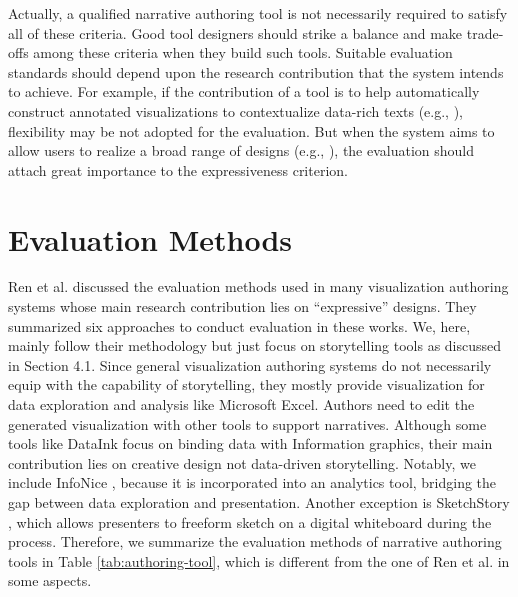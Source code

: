 Actually, a qualified narrative authoring tool is not necessarily required to satisfy all of these criteria. Good tool designers should strike a balance and make trade-offs among these criteria when they build such tools. Suitable evaluation standards should depend upon the research contribution that the system intends to achieve. For example, if the contribution of a tool is to help automatically construct annotated visualizations to contextualize data-rich texts (e.g., \cite{Hullman2013}), flexibility may be not adopted for the evaluation. But when the system aims to allow users to realize a broad range of designs (e.g., \cite{Wang2018}), the evaluation should attach great importance to the expressiveness criterion. 

\section{Evaluation Methods}

Ren et al. \cite{Ren2018} discussed the evaluation methods used in many visualization authoring systems whose main research contribution lies on “expressive” designs. They summarized six approaches to conduct evaluation in these works. We, here, mainly follow their methodology but just focus on storytelling tools as discussed in Section 4.1. Since general visualization authoring systems do not necessarily equip with the capability of storytelling, they mostly provide visualization for data exploration and analysis like Microsoft Excel. Authors need to edit the generated visualization with other tools to support narratives. Although some tools like DataInk \cite{Xia2018} focus on binding data with Information graphics, their main contribution lies on creative design not data-driven storytelling. Notably, we include InfoNice \cite{Wang2018}, because it is incorporated into an analytics tool, bridging the gap between data exploration and presentation. Another exception is SketchStory \cite{Lee2013}, which allows presenters to freeform sketch on a digital whiteboard  during the process. Therefore, we summarize the evaluation methods of narrative authoring tools in Table \ref{tab:authoring-tool}, which is different from the one of Ren et al. in some aspects. 

